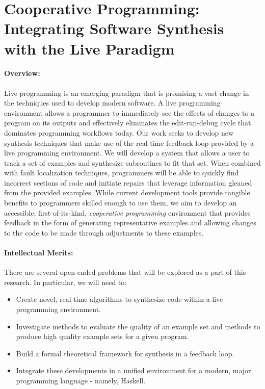 \section*{Cooperative Programming: Integrating Software Synthesis with the Live Paradigm}
\paragraph{Overview:} Live programming is an emerging paradigm that is promising a vast change in the techniques used to develop modern software. A live programming environment allows a programmer to immediately see the effects of changes to a program on its outputs and effectively eliminates the edit-run-debug cycle that dominates programming workflows today. Our work seeks to develop new synthesis techniques that make use of the real-time feedback loop provided by a live programming environment. We will develop a system that allows a user to track a set of examples and synthesize subroutines to fit that set. When combined with fault localization techniques, programmers will be able to quickly find incorrect sections of code and initiate repairs that leverage information gleaned from the provided examples. While current  development tools provide tangible benefits to programmers skilled enough to use them, we aim to develop an accessible, first-of-its-kind, \textit{cooperative programming} environment that provides feedback in the form of generating representative examples and allowing changes to the code to be made through adjustments to these examples.

\paragraph{Intellectual Merits:} There are several open-ended problems that will be explored as a part of this research. In particular, we will need to:

\begin{itemize}
\item Create novel, real-time algorithms to synthesize code within a live programming environment.
\item Investigate methods to evaluate the quality of an example set and methods to produce high quality example sets for a given program.
\item Build a formal theoretical framework for synthesis in a feedback loop.
\item Integrate these developments in a unified environment for a modern, major programming language - namely, Haskell.
\end{itemize}

